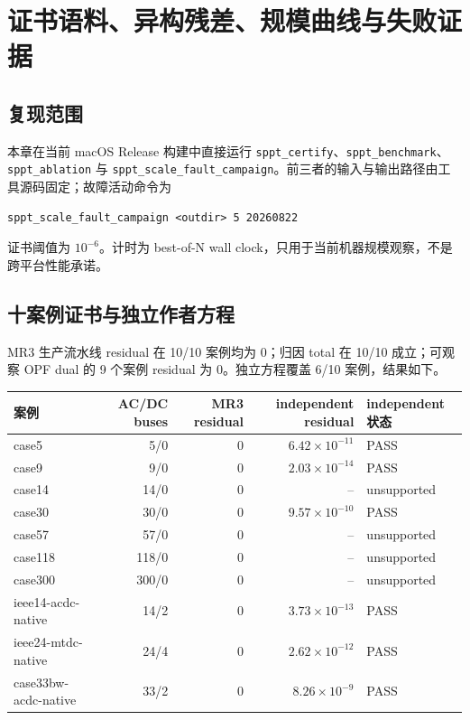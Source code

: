 \section{证书语料、异构残差、规模曲线与失败证据}

\subsection{复现范围}

本章在当前 macOS Release 构建中直接运行
\texttt{sppt\_certify}、\texttt{sppt\_benchmark}、\texttt{sppt\_ablation} 与
\texttt{sppt\_scale\_fault\_campaign}。前三者的输入与输出路径由工具源码固定；故障活动命令为
\begin{verbatim}
sppt_scale_fault_campaign <outdir> 5 20260822
\end{verbatim}
证书阈值为 $10^{-6}$。计时为 best-of-N wall clock，只用于当前机器规模观察，不是跨平台性能承诺。

\subsection{十案例证书与独立作者方程}

MR3 生产流水线 residual 在 10/10 案例均为 0；归因 total 在 10/10 成立；可观察 OPF dual 的 9 个案例
residual 为 0。独立方程覆盖 6/10 案例，结果如下。

\begin{center}\footnotesize
\begin{tabular}{@{}lrrrl@{}}\toprule
案例 & AC/DC buses & MR3 residual & independent residual & independent 状态\\\midrule
case5 & 5/0 & 0 & $6.42\times10^{-11}$ & PASS\\
case9 & 9/0 & 0 & $2.03\times10^{-14}$ & PASS\\
case14 & 14/0 & 0 & -- & unsupported\\
case30 & 30/0 & 0 & $9.57\times10^{-10}$ & PASS\\
case57 & 57/0 & 0 & -- & unsupported\\
case118 & 118/0 & 0 & -- & unsupported\\
case300 & 300/0 & 0 & -- & unsupported\\
ieee14-acdc-native & 14/2 & 0 & $3.73\times10^{-13}$ & PASS\\
ieee24-mtdc-native & 24/4 & 0 & $2.62\times10^{-12}$ & PASS\\
case33bw-acdc-native & 33/2 & 0 & $8.26\times10^{-9}$ & PASS\\\bottomrule
\end{tabular}
\end{center}

